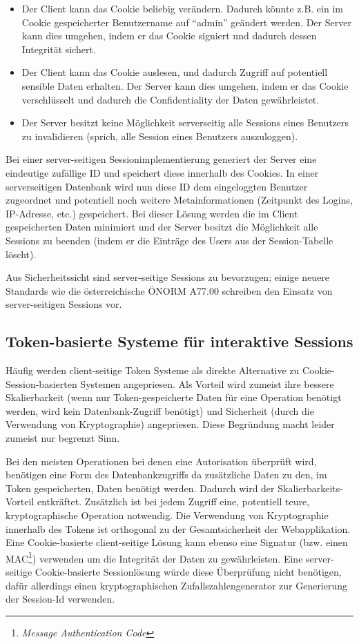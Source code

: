 \begin{itemize}
		\item Der Client kann das Cookie beliebig verändern. Dadurch könnte z.B. ein im Cookie gespeicherter Benutzername auf ``admin'' geändert werden. Der Server kann dies umgehen, indem er das Cookie signiert und dadurch dessen Integrität sichert.
	\item Der Client kann das Cookie auslesen, und dadurch Zugriff auf potentiell sensible Daten erhalten. Der Server kann dies umgehen, indem er das Cookie verschlüsselt und dadurch die Confidentiality der Daten gewährleistet.
	\item Der Server besitzt keine Möglichkeit serverseitig alle Sessions eines Benutzers zu invalidieren (sprich, alle Session eines Benutzers auszuloggen).
\end{itemize}

Bei einer server-seitigen Sessionimplementierung generiert der Server eine eindeutige zufällige ID und speichert diese innerhalb des Cookies. In einer serverseitigen Datenbank wird nun diese ID dem eingeloggten Benutzer zugeordnet und potentiell noch weitere Metainformationen (Zeitpunkt des Logins, IP-Adresse, etc.) gespeichert. Bei dieser Lösung werden die im Client gespeicherten Daten minimiert und der Server besitzt die Möglichkeit alle Sessions zu beenden (indem er die Einträge des Users aus der Session-Tabelle löscht).

Aus Sicherheitssicht sind server-seitige Sessions zu bevorzugen; einige neuere Standards wie die österreichische ÖNORM A77.00 schreiben den Einsatz von server-seitigen Sessions vor.

\subsection{Token-basierte Systeme für interaktive Sessions}

Häufig werden client-seitige Token Systeme als direkte Alternative zu Cookie-Session-basierten Systemen angepriesen. Als Vorteil wird zumeist ihre bessere Skalierbarkeit (wenn nur Token-gespeicherte Daten für eine Operation benötigt werden, wird kein Datenbank-Zugriff benötigt) und Sicherheit (durch die Verwendung von Kryptographie) angepriesen. Diese Begründung macht leider zumeist nur begrenzt Sinn.

Bei den meisten Operationen bei denen eine Autorisation überprüft wird, benötigen eine Form des Datenbankzugriffs da zusätzliche Daten zu den, im Token gespeicherten, Daten benötigt werden. Dadurch wird der Skalierbarkeits-Vorteil entkräftet. Zusätzlich ist bei jedem Zugriff eine, potentiell teure, kryptographische Operation notwendig. Die Verwendung von Kryptographie innerhalb des Tokens ist orthogonal zu der Gesamtsicherheit der Webapplikation. Eine Cookie-basierte client-seitige Lösung kann ebenso eine Signatur (bzw. einen MAC\footnote{\textit{Message Authentication Code}}) verwenden um die Integrität der Daten zu gewährleisten. Eine server-seitige Cookie-basierte Sessionlösung würde diese Überprüfung nicht benötigen, dafür allerdings einen kryptographischen Zufallszahlengenerator zur Generierung der Session-Id verwenden.

